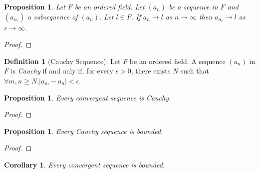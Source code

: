 \documentclass{article}
\let\qed\relax
\newtheorem{proposition}[axiom]{Proposition}
\newtheorem{corollary}{Corollary}[axiom]
\theoremstyle{definition}
\newtheorem{definition}[axiom]{Definition}
\begin{document}
    \begin{proposition}
        Let $F$ be an ordered field. Let $(a_n)$ be a sequence in $F$ and $(a_{n_r})$ a subsequence of
        $(a_n)$. Let $l \in F$. If $a_n \rightarrow l$ as $n \rightarrow \infty$ then $a_{n_r} \rightarrow
        l$ as $r \rightarrow \infty$.
    \end{proposition}

    \begin{proof}
        \pf
        \qed
    \end{proof}
    
    \begin{definition}[Cauchy Sequence]
        Let $F$ be an ordered field. A sequence $(a_n)$ in $F$ is \emph{Cauchy} if and only if, for every
        $\epsilon > 0$, there exists $N$ such that $\forall m,n \geq N. |a_m - a_n| < \epsilon$.
    \end{definition}

    \begin{proposition}
        Every convergent sequence is Cauchy.
    \end{proposition}

    \begin{proof}
        \pf
        \qed
    \end{proof}

    \begin{proposition}
        \label{prop:Cauchy_bounded}
        Every Cauchy sequence is bounded.
    \end{proposition}

    \begin{proof}
        \pf
        \qed
    \end{proof}

    \begin{corollary}
        Every convergent sequence is bounded.
    \end{corollary}
    
\end{document}
